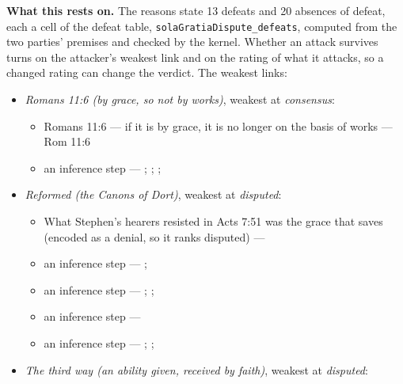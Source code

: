 \documentclass[11pt]{article}
\begin{document}
\par\noindent\textbf{What this rests on.} The reasons state 13 defeats and 20 absences of defeat, each a cell of the defeat table, \texttt{sola\allowbreak{}Gratia\allowbreak{}Dispute\_\allowbreak{}defeats}, computed from the two parties' premises and checked by the kernel. Whether an attack survives turns on the attacker's weakest link and on the rating of what it attacks, so a changed rating can change the verdict. The weakest links:
\begin{itemize}
\item \emph{Romans 11:6 (by grace, so not by works)}, weakest at \emph{consensus}:
\begin{itemize}
\item Romans 11:6 — if it is by grace, it is no longer on the basis of works --- Rom 11:6
\item an inference step --- \cite[Trent, Session VI (1547), ch. 8]{tanner-decrees-1990}; \cite[36]{waterworth-trent-1848}; \cite[Five Arminian Articles (1610), art. 4]{schaff-creeds-christendom-3-1977}; \cite[Canons of Dort, III/IV, art. 10]{schaff-creeds-christendom-3-1977}
\end{itemize}
\item \emph{Reformed (the Canons of Dort)}, weakest at \emph{disputed}:
\begin{itemize}
\item What Stephen’s hearers resisted in Acts 7:51 was the grace that saves (encoded as a denial, so it ranks disputed) --- \cite[Canons of Dort, III/IV, art. 9]{schaff-creeds-christendom-3-1977}
\item an inference step --- \cite[ad loc. Eph 2:8]{robertson-word-pictures-4-1931}; \cite[228--229]{calvin-galatians-ephesians-1854}
\item an inference step --- \cite[600]{arminius-works-1-1825}; \cite[681]{arminius-works-1-1825}; \cite[Five Arminian Articles (1610), art. 4]{schaff-creeds-christendom-3-1977}
\item an inference step --- \cite[527--565]{arminius-works-3-1853}
\item an inference step --- \cite[Solid Declaration II.89]{concordia-triglotta-1921}; \cite[Solid Declaration II.60]{concordia-triglotta-1921}; \cite[Solid Declaration XI.41]{concordia-triglotta-1921}
\end{itemize}
\item \emph{The third way (an ability given, received by faith)}, weakest at \emph{disputed}:
\begin{itemize}

\end{itemize}
\end{itemize}
\end{document}
